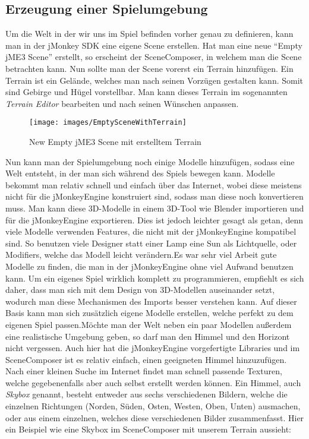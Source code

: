 \subsection{Erzeugung einer Spielumgebung}
Um die Welt in der wir uns im Spiel befinden vorher genau zu definieren, kann man in der jMonkey SDK eine eigene Scene erstellen. Hat man eine neue \enquote{Empty jME3 Scene} erstellt, so erscheint der SceneComposer, in welchem man die Scene betrachten kann.
Nun sollte man der Scene vorerst ein Terrain hinzufügen. Ein Terrain ist ein Gelände, welches man nach seinen Vorzügen gestalten kann. Somit sind Gebirge und Hügel vorstellbar. Man kann dieses Terrain im sogenannten \emph{Terrain Editor} bearbeiten und nach seinen Wünschen anpassen.\begin{figure}[H]
	
	\caption{New Empty jME3 Scene mit erstelltem Terrain}
	
	\centering\texttt{[image: images/EmptySceneWithTerrain]} 
	
\end{figure}\pagebreak
Nun kann man der Spielumgebung noch einige Modelle hinzufügen, sodass eine Welt entsteht, in der man sich während des Spiels bewegen kann. Modelle bekommt man relativ schnell und einfach über das Internet, wobei diese meistens nicht für die jMonkeyEngine konstruiert sind, sodass man diese noch konvertieren muss. Man kann diese 3D-Modelle in einem 3D-Tool wie Blender importieren und für die jMonkeyEngine exportieren. Dies ist jedoch leichter gesagt als getan, denn viele Modelle verwenden Features, die nicht mit der jMonkeyEngine kompatibel sind. So benutzen viele Designer statt einer Lamp eine Sun als Lichtquelle, oder Modifiers, welche das Modell leicht verändern.\newline Es war sehr viel Arbeit gute Modelle zu finden, die man in der jMonkeyEngine ohne viel Aufwand benutzen kann. Um ein eigenes Spiel wirklich komplett zu programmieren, empfiehlt es sich daher, dass man sich mit dem Design von 3D-Modellen auseinander setzt, wodurch man diese Mechanismen des Imports besser verstehen kann. Auf dieser Basis kann man sich zusätzlich eigene Modelle erstellen, welche perfekt zu dem eigenen Spiel passen.\newline Möchte man der Welt neben ein paar Modellen außerdem eine realistische Umgebung geben, so darf man den Himmel und den Horizont nicht vergessen. Auch hier hat die jMonkeyEngine vorgefertigte Libraries und im SceneComposer ist es relativ einfach, einen geeigneten Himmel hinzuzufügen. Nach einer kleinen Suche im Internet findet man schnell passende Texturen, welche gegebenenfalls aber auch selbst erstellt werden können. Ein Himmel, auch \emph{Skybox} genannt, besteht entweder aus sechs verschiedenen Bildern, welche die einzelnen Richtungen (Norden, Süden, Osten, Westen, Oben, Unten) ausmachen, oder aus einem einzelnen, welches diese verschiedenen Bilder zusammenfasst. Hier ein Beispiel wie eine Skybox im SceneComposer mit unserem Terrain aussieht:

